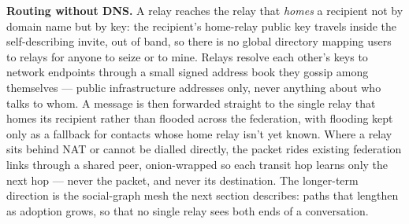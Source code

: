 \documentclass[11pt, a4paper]{article}
\begin{document}
\textbf{Routing without DNS.} A relay reaches the relay that \emph{homes} a recipient not by domain name but by key: the recipient's home-relay public key travels inside the self-describing invite, out of band, so there is no global directory mapping users to relays for anyone to seize or to mine. Relays resolve each other's keys to network endpoints through a small signed address book they gossip among themselves — public infrastructure addresses only, never anything about who talks to whom. A message is then forwarded straight to the single relay that homes its recipient rather than flooded across the federation, with flooding kept only as a fallback for contacts whose home relay isn't yet known. Where a relay sits behind NAT or cannot be dialled directly, the packet rides existing federation links through a shared peer, onion-wrapped so each transit hop learns only the next hop --- never the packet, and never its destination. The longer-term direction is the social-graph mesh the next section describes: paths that lengthen as adoption grows, so that no single relay sees both ends of a conversation.

\vspace{10pt}
\end{document}
